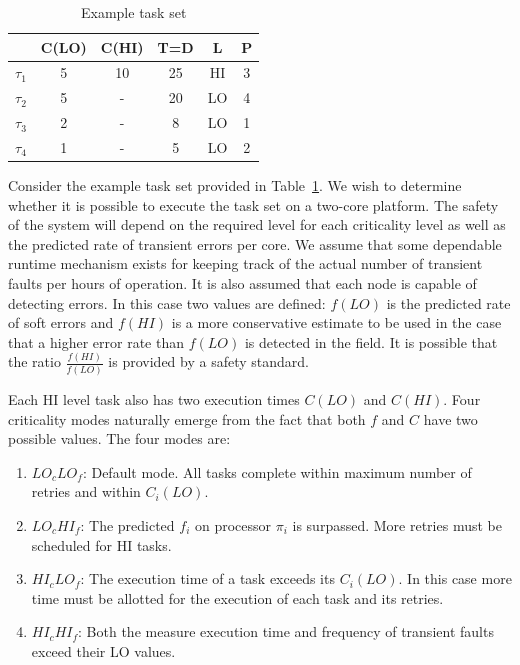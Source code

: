 \documentclass[table,11pt]{article}
\begin{document}
\begin{table}
\centering
\caption{Example task set}
\begin{tabular}{@{}l|ccccc@{}} 
\toprule
		& C(LO) & C(HI) & T=D & L & P	 \\\bottomrule
$\tau_1$ & 5 & 10 & 25 & HI & 3 \\
$\tau_2$ & 5 & - & 20 & LO & 4 \\
$\tau_3$ & 2 & - & 8 & LO & 1 \\
$\tau_4$ & 1 & - & 5 & LO & 2 \\
\end{tabular}
\label{t:exampletask}
\end{table}


Consider the example task set provided in Table~\ref{t:exampletask}. We wish to determine whether it is possible to execute the task set on a two-core platform. The safety of the system will depend on the required level for each criticality level as well as the predicted rate of transient errors per core. We assume that some dependable runtime mechanism exists for keeping track of the actual number of transient faults per hours of operation. It is also assumed that each node is capable of detecting errors. In this case two values are defined: $f(LO)$ is the predicted rate of soft errors and $f(HI)$ is a more conservative estimate to be used in the case that a higher error rate than $f(LO)$ is detected in the field. It is possible that the ratio $\frac{f(HI)}{f(LO)}$ is provided by a safety standard.

Each HI level task also has two execution times $C(LO)$ and $C(HI)$. Four criticality modes naturally emerge from the fact that both $f$ and $C$ have two possible values. The four modes are:

		\begin{enumerate}
		  \item \textbf{$LO_cLO_f$}: Default mode. All tasks complete within maximum number of retries and within $C_i(LO)$.
		  \item \textbf{$LO_cHI_f$}: The predicted $f_i$ on processor $\pi_i$ is surpassed. More retries must be scheduled for HI tasks.
		  \item \textbf{$HI_cLO_f$}: The execution time of a task exceeds its $C_i(LO)$. In this case more time must be allotted for the execution of each task and its retries.
		  \item \textbf{$HI_cHI_f$}: Both the measure execution time and frequency of transient faults exceed their LO values.
		  \end{enumerate}
		  
\end{document}
